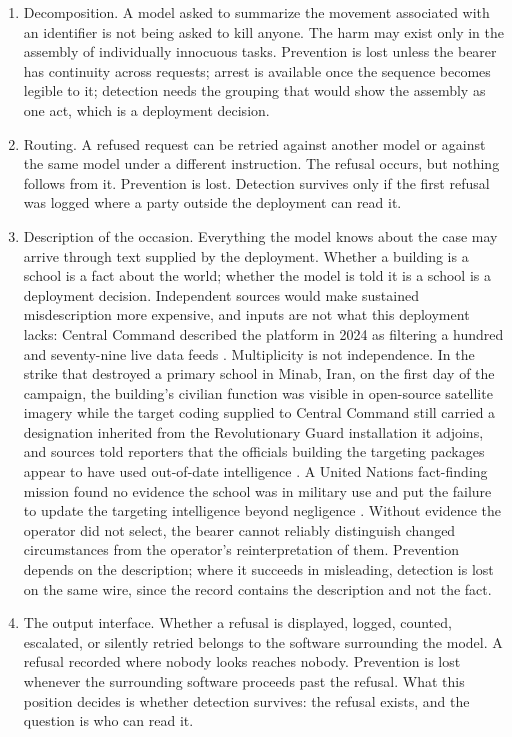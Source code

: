 \begin{enumerate}
  \item Decomposition. A model asked to summarize the movement associated with an identifier is not being asked to kill anyone. The harm may exist only in the assembly of individually innocuous tasks. Prevention is lost unless the bearer has continuity across requests; arrest is available once the sequence becomes legible to it; detection needs the grouping that would show the assembly as one act, which is a deployment decision.
  \item Routing. A refused request can be retried against another model or against the same model under a different instruction. The refusal occurs, but nothing follows from it. Prevention is lost. Detection survives only if the first refusal was logged where a party outside the deployment can read it.
  \item Description of the occasion. Everything the model knows about the case may arrive through text supplied by the deployment. Whether a building is a school is a fact about the world; whether the model is told it is a school is a deployment decision. Independent sources would make sustained misdescription more expensive, and inputs are not what this deployment lacks: Central Command described the platform in 2024 as filtering a hundred and seventy-nine live data feeds \autocite{freedberg2024maven}. Multiplicity is not independence. In the strike that destroyed a primary school in Minab, Iran, on the first day of the campaign, the building's civilian function was visible in open-source satellite imagery while the target coding supplied to Central Command still carried a designation inherited from the Revolutionary Guard installation it adjoins, and sources told reporters that the officials building the targeting packages appear to have used out-of-date intelligence \autocite{ali2026outdated,orenstein2026minab}. A United Nations fact-finding mission found no evidence the school was in military use and put the failure to update the targeting intelligence beyond negligence \autocite{beaumont2026un}. Without evidence the operator did not select, the bearer cannot reliably distinguish changed circumstances from the operator's reinterpretation of them. Prevention depends on the description; where it succeeds in misleading, detection is lost on the same wire, since the record contains the description and not the fact.
  \item The output interface. Whether a refusal is displayed, logged, counted, escalated, or silently retried belongs to the software surrounding the model. A refusal recorded where nobody looks reaches nobody. Prevention is lost whenever the surrounding software proceeds past the refusal. What this position decides is whether detection survives: the refusal exists, and the question is who can read it.

\end{enumerate}

